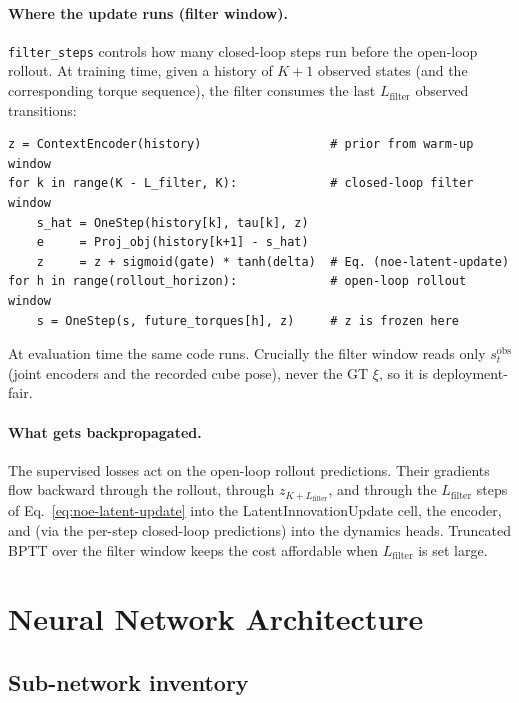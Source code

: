 \documentclass[11pt]{article}
\begin{document}
\paragraph{Where the update runs (filter window).}
\texttt{filter\_steps} controls how many closed-loop steps run before
the open-loop rollout.  At training time, given a history of
$K{+}1$ observed states (and the corresponding torque sequence), the
filter consumes the last $L_{\mathrm{filter}}$ observed transitions:
\begin{lstlisting}
z = ContextEncoder(history)                  # prior from warm-up window
for k in range(K - L_filter, K):             # closed-loop filter window
    s_hat = OneStep(history[k], tau[k], z)
    e     = Proj_obj(history[k+1] - s_hat)
    z     = z + sigmoid(gate) * tanh(delta)  # Eq. (noe-latent-update)
for h in range(rollout_horizon):             # open-loop rollout window
    s = OneStep(s, future_torques[h], z)     # z is frozen here
\end{lstlisting}
At evaluation time the same code runs.  Crucially the filter window
reads only $s_t^{\mathrm{obs}}$ (joint encoders and the recorded
cube pose), never the GT $\xi$, so it is deployment-fair.

\paragraph{What gets backpropagated.}
The supervised losses act on the open-loop rollout predictions.
Their gradients flow backward through the rollout, through
$z_{K{+}L_{\mathrm{filter}}}$, and through the
$L_{\mathrm{filter}}$ steps of
Eq.~\eqref{eq:noe-latent-update} into the LatentInnovationUpdate
cell, the encoder, and (via the per-step closed-loop predictions)
into the dynamics heads.  Truncated BPTT over the filter window
keeps the cost affordable when $L_{\mathrm{filter}}$ is set large.

\section{Neural Network Architecture}
\label{sec:architecture}

\subsection{Sub-network inventory}
\end{document}

